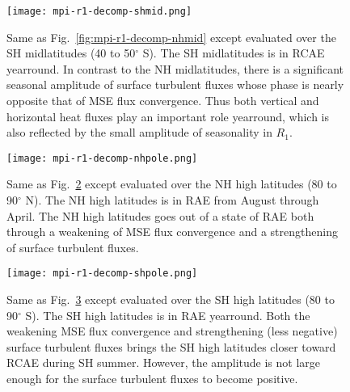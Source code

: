 \documentclass{ametsocV5}
\begin{document}
\begin{figure}[t]
  \noindent\texttt{[image: mpi-r1-decomp-shmid.png]}\\
  \caption{Same as Fig.~\ref{fig:mpi-r1-decomp-nhmid} except evaluated over the SH midlatitudes (40 to 50$^{\circ}$ S). The SH midlatitudes is in RCAE yearround. In contrast to the NH midlatitudes, there is a significant seasonal amplitude of surface turbulent fluxes whose phase is nearly opposite that of MSE flux convergence. Thus both vertical and horizontal heat fluxes play an important role yearround, which is also reflected by the small amplitude of seasonality in \(R_{1}\).}
  \label{fig:mpi-r1-decomp-shmid}
\end{figure}

\begin{figure}[t]
  \noindent\texttt{[image: mpi-r1-decomp-nhpole.png]}\\
  \caption{Same as Fig.~\ref{fig:mpi-r1-decomp-nhpole} except evaluated over the NH high latitudes (80 to 90$^{\circ}$ N). The NH high latitudes is in RAE from August through April. The NH high latitudes goes out of a state of RAE both through a weakening of MSE flux convergence and a strengthening of surface turbulent fluxes.}
  \label{fig:mpi-r1-decomp-nhpole}
\end{figure}

\begin{figure}[t]
  \noindent\texttt{[image: mpi-r1-decomp-shpole.png]}\\
  \caption{Same as Fig.~\ref{fig:mpi-r1-decomp-shpole} except evaluated over the SH high latitudes (80 to 90$^{\circ}$ S). The SH high latitudes is in RAE yearround. Both the weakening MSE flux convergence and strengthening (less negative) surface turbulent fluxes brings the SH high latitudes closer toward RCAE during SH summer. However, the amplitude is not large enough for the surface turbulent fluxes to become positive.}
  \label{fig:mpi-r1-decomp-shpole}
\end{figure}
\end{document}
